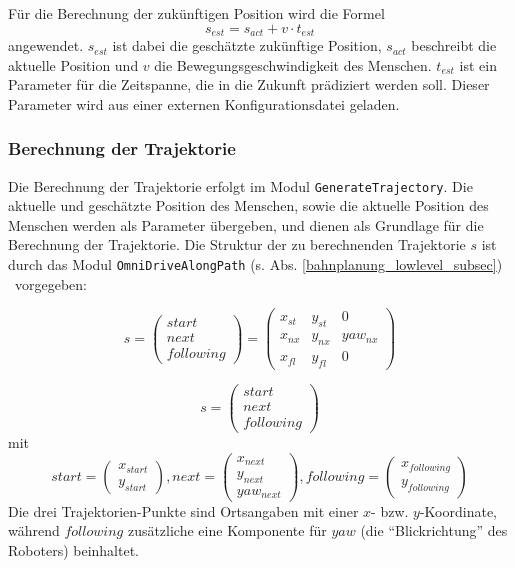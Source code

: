 Für die Berechnung der zukünftigen Position wird die Formel
\begin{equation}
	s_{est} = s_{act} + v \cdot t_{est}
\end{equation}
angewendet.
$s_{est}$ ist dabei die geschätzte zukünftige Position, $s_{act}$ beschreibt die aktuelle Position und $v$ die Bewegungsgeschwindigkeit des Menschen.
$t_{est}$ ist ein Parameter für die Zeitspanne, die in die Zukunft prädiziert werden soll.
Dieser Parameter wird aus einer externen Konfigurationsdatei geladen.


\subsubsection{Berechnung der Trajektorie}

Die Berechnung der Trajektorie erfolgt im Modul \lstinline{GenerateTrajectory}.
Die aktuelle und geschätzte Position des Menschen, sowie die aktuelle Position des Menschen werden als Parameter übergeben, und dienen als Grundlage für die Berechnung der Trajektorie.
Die Struktur der zu berechnenden Trajektorie $s$ ist durch das Modul \lstinline{OmniDriveAlongPath} (s. Abs. \ref{bahnplanung_lowlevel_subsec}) \ vorgegeben:

\begin{equation}
	s =
	\begin{pmatrix} start \\ next \\ following \end{pmatrix} =
	\begin{pmatrix} x_{st} & y_{st} & 0 \\ x_{nx} & y_{nx} & yaw_{nx} \\ x_{fl} & y_{fl} & 0 \end{pmatrix}
\end{equation}


\begin{equation}
	s =	\begin{pmatrix} start \\ next \\ following \end{pmatrix}
\end{equation}
mit 
\begin{equation}
	start = 		\begin{pmatrix}	x_{start} \\ y_{start}							\end{pmatrix},
	next = 			\begin{pmatrix} x_{next} \\ y_{next} \\ yaw_{next}	\end{pmatrix},
	following =	\begin{pmatrix}	x_{following} \\ y_{following}							\end{pmatrix}
\end{equation}
Die drei Trajektorien-Punkte sind Ortsangaben mit einer $x$- bzw. $y$-Koordinate, während $following$ zusätzliche eine Komponente für $yaw$ (die ``Blickrichtung'' des Roboters) beinhaltet.

